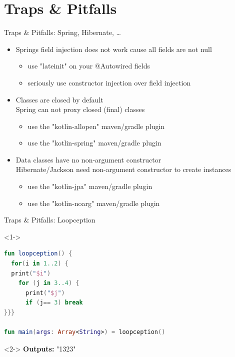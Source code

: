 \section{Traps \& Pitfalls}

\begin{frame}{Traps \& Pitfalls: Spring, Hibernate, \dots}
	\begin{itemize}
		\item Springs field injection does not work cause all fields are not null
		\begin{itemize}
			\item use "lateinit" on your @Autowired fields
			\item seriously use constructor injection over field injection
		\end{itemize}
		\item Classes are closed by default\\
		Spring can not proxy closed (final) classes
		\begin{itemize}
			\item use the "kotlin-allopen" maven/gradle plugin
			\item use the "kotlin-spring" maven/gradle plugin
		\end{itemize}
		\item Data classes have no non-argument constructor\\
		Hibernate/Jackson need non-argument constructor to create instances
		\begin{itemize}
			\item use the "kotlin-jpa" maven/gradle plugin
			\item use the "kotlin-noarg" maven/gradle plugin
		\end{itemize}
	\end{itemize}
\end{frame}

\begin{frame}[fragile]{Traps \& Pitfalls: Loopception}
	\begin{overlayarea}{\textwidth}{\textheight}
		\begin{onlyenv}<1->
\begin{lstlisting}[language=Kotlin,basicstyle=\ttfamily\small]
fun loopception() {
  for(i in 1..2) {
  print("$i")
    for (j in 3..4) {
      print("$j")
      if (j== 3) break
}}}

fun main(args: Array<String>) = loopception()
\end{lstlisting}
		\end{onlyenv}
		\begin{onlyenv}<2->
			\textbf{Outputs:} "1323"
		\end{onlyenv}
	\end{overlayarea}
\end{frame}

